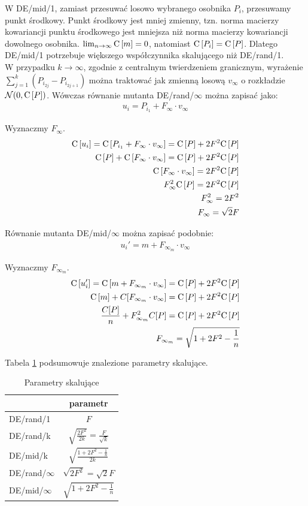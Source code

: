 \documentclass[12pt, a4paper]{article}
\def\C{{\rm C}\,}
\begin{document}
W DE/mid/1, zamiast przesuwać losowo wybranego osobnika $P_i$, przesuwamy punkt środkowy.
Punkt środkowy jest mniej zmienny, 
tzn. norma macierzy kowariancji punktu środkowego jest mniejsza niż norma macierzy kowariancji dowolnego osobnika.
$\lim_{n\to\infty} \C[m] = 0$, natomiast $\C[P_i] = \C[P]$.
Dlatego DE/mid/1 potrzebuje większego współczynnika skalującego niż DE/rand/1. \\

W przypadku $k\to\infty$, zgodnie z centralnym twierdzeniem granicznym, wyrażenie $\sum\limits_{j=1}^k (P_{i_{2j}} - P_{i_{2j+1}})$ 
można traktować jak zmienną losową $v_\infty$ o rozkładzie $\mathcal{N}(0, \C[P])$. 
Wówczas równanie mutanta DE/rand/$\infty$ można zapisać jako:
\begin{align*}
u_i = P_{i_1} + F_\infty \cdot v_\infty
\end{align*}

Wyznaczmy $F_\infty$.
\begin{align*}
\C[u_i] = \C[P_{i_1} + F_\infty \cdot v_\infty] = \C[P] + 2F^2\C[P] \\
\C[P] + \C[F_\infty \cdot v_\infty] = \C[P] + 2F^2\C[P] \\
\C[F_\infty \cdot v_\infty] = 2F^2\C[P] \\
F_\infty^2 \C[P] = 2F^2\C[P] \\
F_\infty^2 = 2F^2 \\
F_\infty = \sqrt{2}F
\end{align*}

Równanie mutanta DE/mid/$\infty$ można zapisać podobnie:
\begin{align*}
u_i' = m + F_{\infty_m} \cdot v_\infty
\end{align*}

Wyznaczmy $F_{\infty_m}$.
\begin{align*}
\C[u_i'] = \C[m + F_{\infty_m} \cdot v_\infty] = \C[P] + 2F^2\C[P] \\
\C[m] + C[F_{\infty_m} \cdot v_\infty] = \C[P] + 2F^2\C[P] \\
\frac{C[P]}{n} + F_{\infty_m}^2 C[P] = \C[P] + 2F^2\C[P] \\
F_{\infty_m} = \sqrt{1 + 2F^2 - \frac{1}{n}}
\end{align*}

Tabela \ref{table:parametry} podsumowuje znalezione parametry skalujące.

\begin{table}[H]
\centering
\begin{tabular}{ l | c }
                 & parametr \\ \hline
DE/rand/1        & $F$ \\ 
DE/rand/k        & $\sqrt{\frac{2F^2}{2k}} = \frac{F}{\sqrt{k}}$ \\ 
DE/mid/k         & $\sqrt{\frac{1 + 2F^2 - \frac{1}{n}}{2k}}$ \\
DE/rand/$\infty$ & $\sqrt{2F^2} = \sqrt{2}F$ \\ 
DE/mid/$\infty$  & $\sqrt{1 + 2F^2 - \frac{1}{n}}$ \\
\end{tabular}
\caption{Parametry skalujące}
\label{table:parametry}
\end{table}
\end{document}
